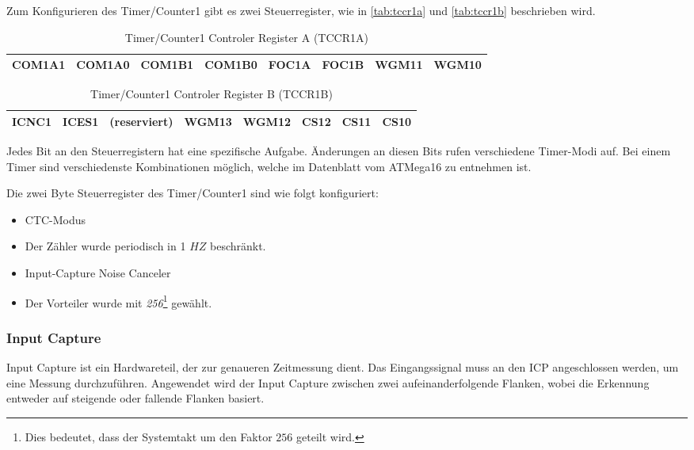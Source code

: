 Zum Konfigurieren des Timer/Counter1 gibt es zwei Steuerregister, wie in \autoref{tab:tccr1a} und \autoref{tab:tccr1b} beschrieben wird. \smallskip \smallskip

\begin{table}[htbp]
	\centering
	\begin{tabular}{ |c|c|c|c|c|c|c|c|} \hline
		COM1A1 & COM1A0 & COM1B1 & COM1B0 & FOC1A & FOC1B & WGM11 & WGM10 \\ \hline
	\end{tabular}
	\caption{Timer/Counter1 Controler Register A (TCCR1A)}\label{tab:tccr1a}
\end{table}

\begin{table}[htbp]
	\centering
	\begin{tabular}{ |c|c|c|c|c|c|c|c|} \hline
		ICNC1 & ICES1 & (reserviert) & WGM13 & WGM12 & CS12 & CS11 & CS10 \\ \hline
	\end{tabular}
	\caption{Timer/Counter1 Controler Register B (TCCR1B)}\label{tab:tccr1b}
\end{table}

Jedes Bit an den Steuerregistern hat eine spezifische Aufgabe. Änderungen an diesen Bits rufen verschiedene Timer-Modi auf. Bei einem Timer sind verschiedenste Kombinationen möglich, welche im Datenblatt vom ATMega16 zu entnehmen ist. \smallskip \smallskip

Die zwei Byte Steuerregister des Timer/Counter1 sind wie folgt konfiguriert:

\begin{itemize}
	\item CTC-Modus
	\item Der Zähler wurde periodisch in 1 $HZ$ beschränkt.
	\item Input-Capture Noise Canceler
	\item Der Vorteiler wurde mit \textit{256}\footnote{Dies bedeutet, dass der Systemtakt um den Faktor $256$ geteilt wird.} gewählt.
\end{itemize}

\subsubsection{Input Capture}

Input Capture ist ein Hardwareteil, der zur genaueren Zeitmessung dient. Das Eingangssignal muss an den ICP angeschlossen werden, um eine Messung durchzuführen. Angewendet wird der Input Capture zwischen zwei aufeinanderfolgende Flanken, wobei die Erkennung entweder auf steigende oder fallende Flanken basiert. \smallskip \smallskip

